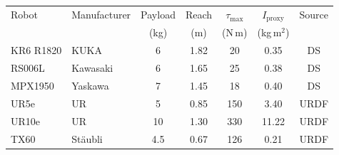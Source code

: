 \begin{tabular}{llccccc}
\toprule
Robot & Manufacturer & Payload & Reach & $\tau_{\max}$ & $I_{\mathrm{proxy}}$ & Source \\
      &              & (kg)    & (m)   & (N\,m)        & (kg\,m$^2$)          &        \\
\midrule
KR6 R1820 & KUKA & 6 & 1.82 & 20 & 0.35 & DS \\
RS006L & Kawasaki & 6 & 1.65 & 25 & 0.38 & DS \\
MPX1950 & Yaskawa & 7 & 1.45 & 18 & 0.40 & DS \\
UR5e & UR & 5 & 0.85 & 150 & 3.40 & URDF \\
UR10e & UR & 10 & 1.30 & 330 & 11.22 & URDF \\
TX60 & St\"aubli & 4.5 & 0.67 & 126 & 0.21 & URDF \\
\bottomrule
\end{tabular}
